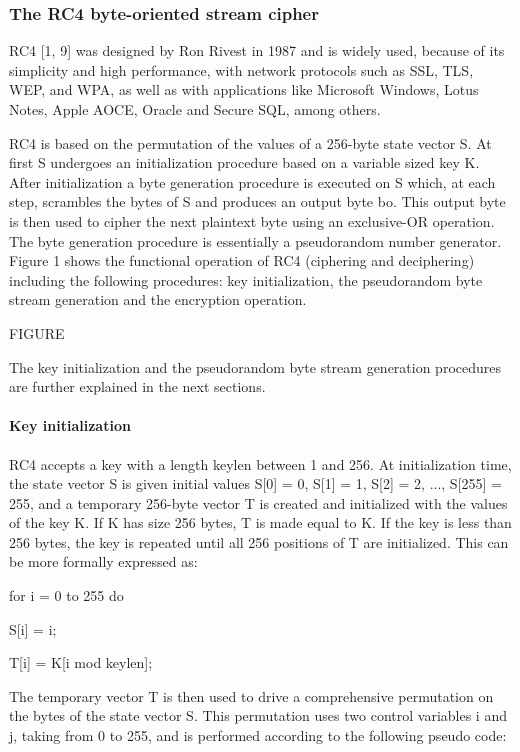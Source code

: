 \documentclass[conference]{IEEEtran}
\begin{document}
\subsubsection{The RC4 byte-oriented stream cipher}

RC4 [1, 9] was designed by Ron Rivest in 1987 and is widely used, because of its simplicity and high performance, with network protocols such as SSL, TLS, WEP, and WPA, as well as with applications like Microsoft Windows, Lotus Notes, Apple AOCE, Oracle and Secure SQL, among others. 

RC4 is based on the permutation of the values of a 256-byte state vector S. At first S undergoes an initialization procedure based on a variable sized key K. After initialization a byte generation procedure is executed on S which, at each step, scrambles the bytes of S and produces an output byte bo. This output byte is then used to cipher the next plaintext byte using an exclusive-OR operation. The byte generation procedure is essentially a pseudorandom number generator. Figure 1 shows the functional operation of RC4 (ciphering and deciphering) including the following procedures: key initialization, the pseudorandom byte stream generation and the encryption operation.

FIGURE

The key initialization and the pseudorandom byte stream generation procedures are further explained in the next sections.

\paragraph{Key initialization}

RC4 accepts a key with a length keylen between 1 and 256. At initialization time, the state vector S is given initial values S[0] = 0, S[1] = 1, S[2] = 2, ..., S[255] = 255, and a temporary 256-byte vector T is created and initialized with the values of the key K. If K has size 256 bytes, T is made equal to K. If the key is less than 256 bytes, the key is repeated until all 256 positions of T are initialized. This can be more formally expressed as:

for i = 0 to 255 do  

   S[i] = i; 
   
   T[i] = K[i mod keylen];

The temporary vector T is then used to drive a comprehensive permutation on the bytes of the state vector S. This permutation uses two control variables i and j, taking from 0 to 255, and is performed according to the following pseudo code:
\end{document}
